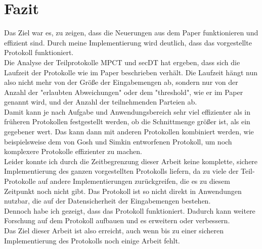 \chapter{Fazit}

Das Ziel war es, zu zeigen, dass die Neuerungen aus dem Paper \cite{Doettling2021} funktionieren und effizient sind. Durch meine Implementierung wird deutlich, dass das vorgestellte Protokoll funktioniert. \\
Die Analyse der Teilprotokolle MPCT und secDT hat ergeben, dass sich die Laufzeit der Protokolle wie im Paper beschrieben verhält. Die Laufzeit hängt nun also nicht mehr von der Größe der Eingabemengen ab, sondern nur von der Anzahl der "erlaubten Abweichungen" oder dem "threshold", wie er im Paper genannt wird, und der Anzahl der teilnehmenden Parteien ab.\\
Damit kann je nach Aufgabe und Anwendungsbereich sehr viel effizienter als in früheren Protokollen festgestellt werden, ob die Schnittmenge größer ist, als ein gegebener wert. Das kann dann mit anderen Protokollen kombiniert werden, wie beispielsweise dem von Gosh und Simkin \cite{Ghosh2019} entworfenen Protokoll, um noch komplexere Protokolle effizienter zu machen. \\
Leider konnte ich durch die Zeitbegrenzung dieser Arbeit keine komplette, sichere Implementierung des ganzen vorgestellten Protokolls liefern, da zu viele der Teil-Protokolle auf andere Implementierungen zurückgreifen, die es zu diesem Zeitpunkt noch nicht gibt.
Das Protokoll ist so nicht direkt in Anwendungen nutzbar, die auf der Datensicherheit der Eingabemengen bestehen.\\
Dennoch habe ich gezeigt, dass das Protokoll funktioniert. Dadurch kann weitere Forschung auf dem Protokoll aufbauen und es erweitern oder verbessern.\\
Das Ziel dieser Arbeit ist also erreicht, auch wenn bis zu einer sicheren Implementierung des Protokolls noch einige Arbeit fehlt.